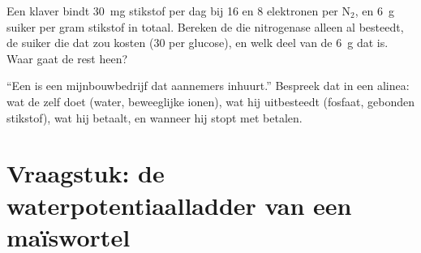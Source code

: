 \begin{exercise}[$\star\star\star$]\label{exo:b1:plant-water-minerals:11}
Een klaver bindt \qty{30}{mg} stikstof per dag bij \qty{16}{}  en
\qty{8}{} elektronen per $\mathrm{N_2}$, en \qty{6}{g} suiker per gram
stikstof in totaal. Bereken de  die nitrogenase alleen al besteedt, de
suiker die dat zou kosten (30  per glucose), en welk deel van de
\qty{6}{g} dat is. Waar gaat de rest heen?
\end{exercise}

\begin{exercise}[$\star\star\star$]\label{exo:b1:plant-water-minerals:12}
``Een  is een mijnbouwbedrijf dat aannemers inhuurt.'' Bespreek dat in
een alinea: wat de  zelf doet (water, beweeglijke ionen), wat hij
uitbesteedt (fosfaat, gebonden stikstof), wat hij betaalt, en wanneer hij
stopt met betalen.
\end{exercise}

\section{Vraagstuk: de waterpotentiaalladder van een maïswortel}

